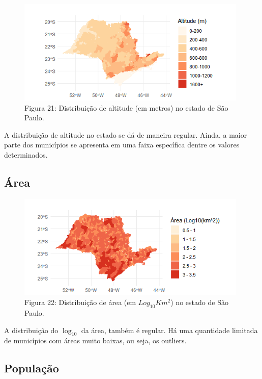 \documentclass[12pt]{extarticle}
\newenvironment{resposta}{ \color{mygray}}{}
\begin{document}
\begin{figure}[h!]
\centering
\includegraphics[height = 5cm]{Imagens/M01.png}
\\{\scriptsize Figura 21: Distribuição de altitude (em metros) no estado de São Paulo.}
\end{figure}

\begin{resposta}
A distribuição de altitude no estado se dá de maneira regular. Ainda, a maior parte dos municípios se apresenta em uma faixa específica dentre os valores determinados.
\end{resposta}

\subsection {Área}

\begin{figure}[h!]
\centering
\includegraphics[height = 5cm]{Imagens/M02.png}
\\{\scriptsize Figura 22: Distribuição de área (em $Log_{10}Km^2$) no estado de São Paulo.}
\end{figure}

\begin{resposta}
A distribuição do $\log_{10}$ da área, também é regular. Há uma quantidade limitada de municípios com áreas muito baixas, ou seja, os outliers.
\end{resposta}


\subsection {População}
\end{document}
